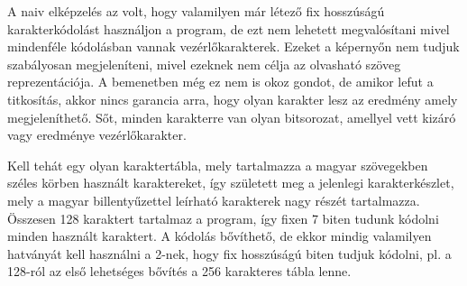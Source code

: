 \documentclass[12pt]{article}
\begin{document}
	A naiv elképzelés az volt, hogy valamilyen már létező fix hosszúságú karakterkódolást használjon a program, de ezt nem lehetett megvalósítani mivel mindenféle kódolásban vannak vezérlőkarakterek. Ezeket a képernyőn nem tudjuk szabályosan megjeleníteni, mivel ezeknek nem célja az olvasható szöveg reprezentációja. A bemenetben még ez nem is okoz gondot, de amikor lefut a titkosítás, akkor nincs garancia arra, hogy olyan karakter lesz az eredmény amely megjeleníthető. Sőt, minden karakterre van olyan bitsorozat, amellyel vett kizáró vagy eredménye vezérlőkarakter.
	
	Kell tehát egy olyan karaktertábla, mely tartalmazza a magyar szövegekben széles körben használt karaktereket, így született meg a jelenlegi karakterkészlet, mely a magyar billentyűzettel leírható karakterek nagy részét tartalmazza. Összesen 128 karaktert tartalmaz a program, így fixen 7 biten tudunk kódolni minden használt karaktert. A kódolás bővíthető, de ekkor mindig valamilyen hatványát kell használni a 2-nek, hogy fix hosszúságú biten tudjuk kódolni, pl. a 128-ról az első lehetséges bővítés a 256 karakteres tábla lenne.
	
\end{document}
